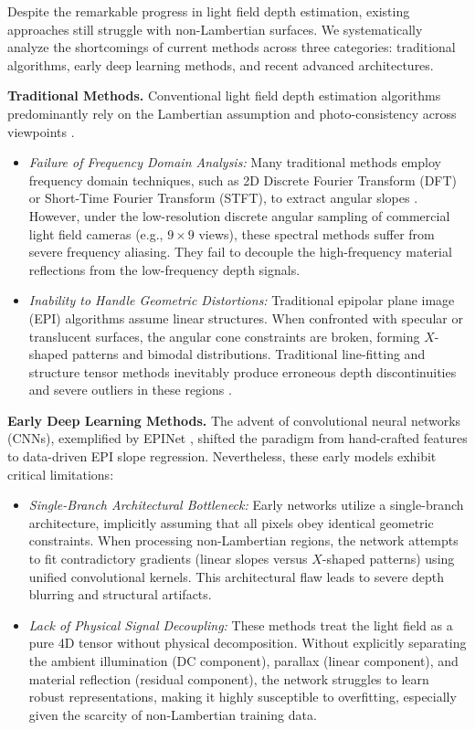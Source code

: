 \documentclass[lettersize,journal]{IEEEtran}
\begin{document}
Despite the remarkable progress in light field depth estimation, existing approaches still struggle with non-Lambertian surfaces. We systematically analyze the shortcomings of current methods across three categories: traditional algorithms, early deep learning methods, and recent advanced architectures.

\textbf{Traditional Methods.} 
Conventional light field depth estimation algorithms predominantly rely on the Lambertian assumption and photo-consistency across viewpoints \cite{wanner2012variational, johan2014lenslet}. 
\begin{itemize}
    \item \textit{Failure of Frequency Domain Analysis:} Many traditional methods employ frequency domain techniques, such as 2D Discrete Fourier Transform (DFT) or Short-Time Fourier Transform (STFT), to extract angular slopes \cite{kim2013depth}. However, under the low-resolution discrete angular sampling of commercial light field cameras (e.g., $9 \times 9$ views), these spectral methods suffer from severe frequency aliasing. They fail to decouple the high-frequency material reflections from the low-frequency depth signals.
    \item \textit{Inability to Handle Geometric Distortions:} Traditional epipolar plane image (EPI) algorithms assume linear structures. When confronted with specular or translucent surfaces, the angular cone constraints are broken, forming $X$-shaped patterns and bimodal distributions. Traditional line-fitting and structure tensor methods inevitably produce erroneous depth discontinuities and severe outliers in these regions \cite{zhang2015light}.
\end{itemize}

\textbf{Early Deep Learning Methods.} 
The advent of convolutional neural networks (CNNs), exemplified by EPINet \cite{shin2018epinet}, shifted the paradigm from hand-crafted features to data-driven EPI slope regression. Nevertheless, these early models exhibit critical limitations:
\begin{itemize}
    \item \textit{Single-Branch Architectural Bottleneck:} Early networks utilize a single-branch architecture, implicitly assuming that all pixels obey identical geometric constraints. When processing non-Lambertian regions, the network attempts to fit contradictory gradients (linear slopes versus $X$-shaped patterns) using unified convolutional kernels. This architectural flaw leads to severe depth blurring and structural artifacts.
    \item \textit{Lack of Physical Signal Decoupling:} These methods treat the light field as a pure 4D tensor without physical decomposition. Without explicitly separating the ambient illumination (DC component), parallax (linear component), and material reflection (residual component), the network struggles to learn robust representations, making it highly susceptible to overfitting, especially given the scarcity of non-Lambertian training data.
\end{itemize}
\end{document}
